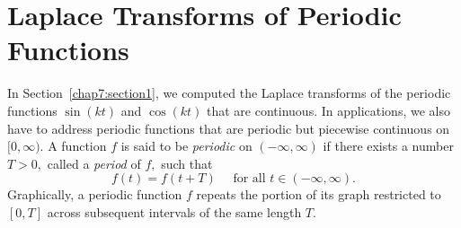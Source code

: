 \section{Laplace Transforms of Periodic Functions}
In Section~\ref{chap7:section1}, we computed the Laplace transforms of the periodic functions $\sin(kt)$ and $\cos(kt)$ that are continuous. In applications, we also have to address periodic functions that are periodic but piecewise continuous on $[0, \infty).$
A function $f$ is said to be \textit{periodic} on $(-\infty, \infty)$  if there exists a number $T>0,$ called a \textit{period} of $f,$ such that 
\[ f(t) = f(t+T)\quad\text{ for all } t\in (-\infty, \infty).\]
Graphically, a periodic function $f$ repeats the portion of its graph restricted to $[0, T]$ across subsequent intervals of the same length $T$. 

